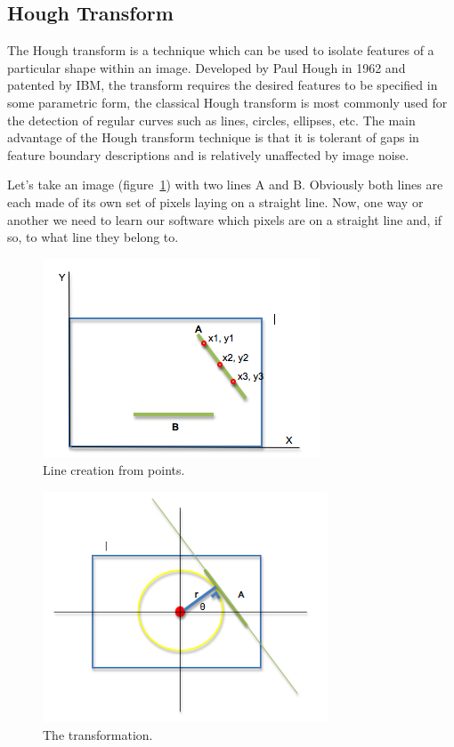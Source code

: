 \subsection{Hough Transform}

The Hough transform is a technique which can be used to isolate features of a particular shape within an image. Developed by Paul Hough in 1962 and patented by IBM, the transform requires the desired features to be specified in some parametric form, the classical Hough transform is most commonly used for the detection of regular curves such as lines, circles, ellipses, etc. The main advantage of the Hough transform technique is that it is tolerant of gaps in feature boundary descriptions and is relatively unaffected by image noise.

Let's take an image (figure~\ref{fig:lane5}) with two lines A and B. Obviously both lines are each made of its own set of pixels laying on a straight line. Now, one way or another we need to learn our software which pixels are on a straight line and, if so, to what line they belong to.

\begin{figure}
\begin{center}
    \includegraphics[scale=0.6]{img/lane5.png}
\end{center}
\caption{Line creation from points.}
\label{fig:lane5}
\end{figure}

\begin{figure}
\begin{center}
    \includegraphics[scale=0.6]{img/lane6.png}
\end{center}
\caption{The transformation.}
\label{fig:lane6}
\end{figure}


